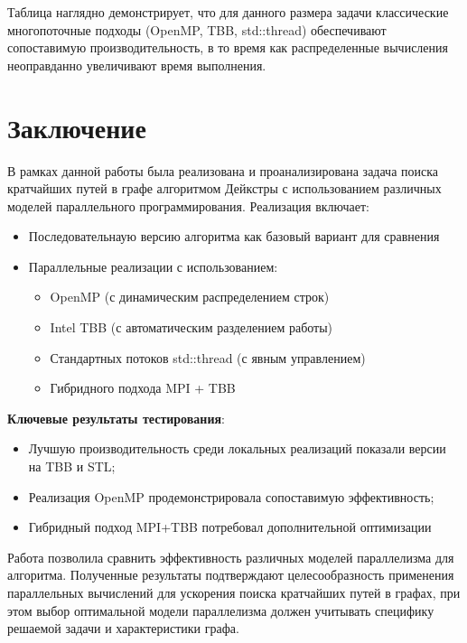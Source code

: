 \documentclass[12pt]{article}
\begin{document}
Таблица наглядно демонстрирует, что для данного размера задачи классические многопоточные подходы (OpenMP, TBB, std::thread) обеспечивают сопоставимую производительность, в то время как распределенные вычисления неоправданно увеличивают время выполнения.
\section{Заключение}

\hspace*{1.25em}В рамках данной работы была реализована и проанализирована задача поиска кратчайших путей в графе алгоритмом Дейкстры с использованием различных моделей параллельного программирования. Реализация включает:

\begin{itemize}
\item Последовательнаую версию алгоритма как базовый вариант для сравнения
\item Параллельные реализации с использованием:
\begin{itemize}
\item OpenMP (с динамическим распределением строк)
\item Intel TBB (с автоматическим разделением работы)
\item Стандартных потоков std::thread (с явным управлением)
\item Гибридного подхода MPI + TBB
\end{itemize}
\end{itemize}

\textbf{Ключевые результаты тестирования}:
\begin{itemize}
\item Лучшую производительность среди локальных реализаций показали версии на TBB и STL;
\item Реализация OpenMP продемонстрировала сопоставимую эффективность;
\item Гибридный подход MPI+TBB потребовал дополнительной оптимизации
\end{itemize}

\hspace*{1.25em}Работа позволила сравнить эффективность различных моделей параллелизма для алгоритма. Полученные результаты подтверждают  целесообразность применения параллельных вычислений для ускорения поиска кратчайших путей в графах, при этом выбор оптимальной модели параллелизма должен учитывать специфику решаемой задачи и характеристики графа.
\end{document}
